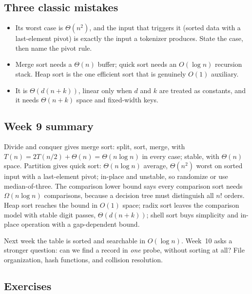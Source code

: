 \documentclass[11pt]{article}
\begin{document}
\subsection*{Three classic mistakes}

\begin{itemize}
  \item {} Its worst case is $\Theta(n^2)$, and the input that triggers it (sorted data with a last-element pivot) is exactly the input a tokenizer produces. State the case, then name the pivot rule.
  \item {} Merge sort needs a $\Theta(n)$ buffer; quick sort needs an $O(\log n)$ recursion stack. Heap sort is the one efficient sort that is genuinely $O(1)$ auxiliary.
  \item {} It is $\Theta(d(n+k))$, linear only when $d$ and $k$ are treated as constants, and it needs $\Theta(n+k)$ space and fixed-width keys.
\end{itemize}

\subsection*{Week 9 summary}

Divide and conquer gives merge sort: split, sort, merge, with $T(n)=2T(n/2)+\Theta(n)=\Theta(n\log n)$ in every case; stable, with $\Theta(n)$ space. Partition gives quick sort: $\Theta(n\log n)$ average, $\Theta(n^2)$ worst on sorted input with a last-element pivot; in-place and unstable, so randomize or use median-of-three. The comparison lower bound says every comparison sort needs $\Omega(n\log n)$ comparisons, because a decision tree must distinguish all $n!$ orders. Heap sort reaches the bound in $O(1)$ space; radix sort leaves the comparison model with stable digit passes, $\Theta(d(n+k))$; shell sort buys simplicity and in-place operation with a gap-dependent bound.

Next week the table is sorted and searchable in $O(\log n)$. Week~10 asks a stronger question: can we find a record in \emph{one} probe, without sorting at all? File organization, hash functions, and collision resolution.

\subsection*{Exercises}
\end{document}
